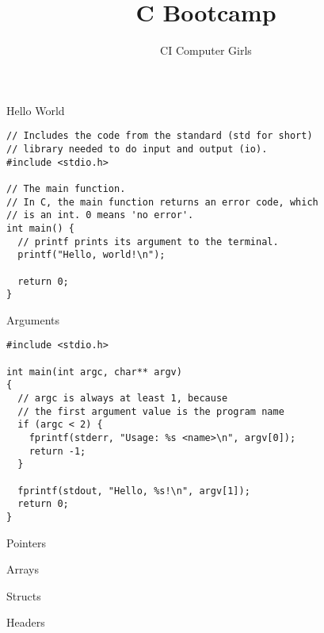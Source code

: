 \documentclass[pdf]{beamer}
\title{C Bootcamp}
\author{CI Computer Girls}
\begin{document}
\begin{frame}
  \titlepage%
\end{frame}

\begin{frame}[fragile]{Hello World}

\begin{verbatim}
// Includes the code from the standard (std for short)
// library needed to do input and output (io).
#include <stdio.h>

// The main function.
// In C, the main function returns an error code, which
// is an int. 0 means 'no error'.
int main() {
  // printf prints its argument to the terminal.
  printf("Hello, world!\n");

  return 0;
}
\end{verbatim}

\end{frame}

\begin{frame}[fragile]{Arguments}

\begin{verbatim}
#include <stdio.h>

int main(int argc, char** argv)
{
  // argc is always at least 1, because
  // the first argument value is the program name
  if (argc < 2) {
    fprintf(stderr, "Usage: %s <name>\n", argv[0]);
    return -1;
  }

  fprintf(stdout, "Hello, %s!\n", argv[1]);
  return 0;
}
\end{verbatim}

\end{frame}

\begin{frame}{Pointers}

\end{frame}

\begin{frame}{Arrays}

\end{frame}

\begin{frame}{Structs}

\end{frame}

\begin{frame}{Headers}

\end{frame}
\end{document}
